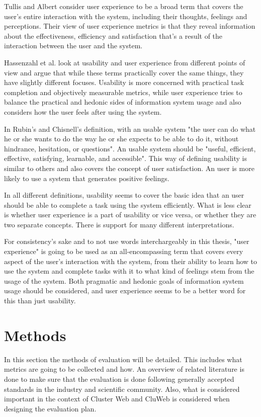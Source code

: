 \cite{bevan2009difference, bevaniso, bevanevaluation, bevanstandard}

Tullis and Albert consider user experience to be a broad term that covers the user's entire interaction with the system, including their thoughts, feelings and perceptions. Their view of user experience metrics is that they reveal information about the effectiveness, efficiency and satisfaction that's a result of the interaction between the user and the system. \cite{albert2013measuring}

Hassenzahl et al. look at usability and user experience from different points of view and argue that while these terms practically cover the same things, they have slightly different focuses. Usability is more concerned with practical task completion and objectively measurable metrics, while user experience tries to balance the practical and hedonic sides of information system usage and also considers how the user feels after using the system.
\cite{hassenzahl2006user}

In Rubin's and Chisnell's definition, with an usable system "the user can do what he or she wants to do the way he or she expects to be able to do it, without hindrance, hesitation, or questions". An usable system should be "useful, efficient, effective, satisfying, learnable, and accessible". \cite{rubin2008handbook} This way of defining usability is similar to others and also covers the concept of user satisfaction. An user is more likely to use a system that generates positive feelings.

In all different definitions, usability seems to cover the basic idea that an user should be able to complete a task using the system efficiently. What is less clear is whether user experience is a part of usability or vice versa, or whether they are two separate concepts. There is support for many different interpretations.

For consistency's sake and  to not use words interchargeably in this thesis, "user experience" is going to be used as an all-encompassing term that covers every aspect of the user's interaction with the system, from their ability to learn how to use the system and complete tasks with it to what kind of feelings stem from the usage of the system. Both pragmatic and hedonic goals of information system usage should be considered, and user experience seems to be a better word for this than just usability.

\section{Methods}
In this section the methods of evaluation will be detailed. This includes what metrics are going to be collected and how. An overview of related literature is done to make sure that the evaluation is done following generally accepted standards in the industry and scientific community. Also, what is considered important in the context of Cluster Web and CluWeb is considered when designing the evaluation plan.

